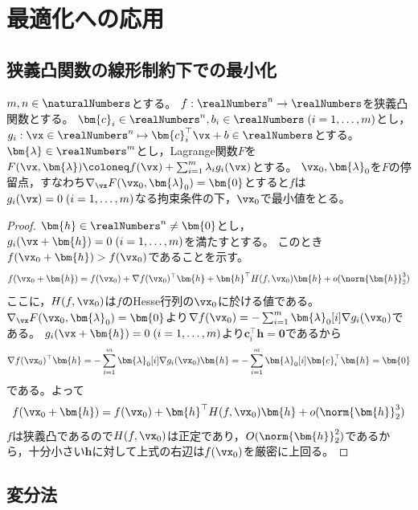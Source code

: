 \chapter{最適化への応用}
    \section{狭義凸関数の線形制約下での最小化}
        \begin{shadebox}
            $m,n\in\naturalNumbers$とする。
            $f: \realNumbers^n \to \realNumbers$を狭義凸関数とする。
            $\bm{c}_i \in \realNumbers^n, b_i \in \realNumbers\;(i=1,\dotsc,m)$とし，$g_i: \vx \in \realNumbers^n \mapsto \bm{c}_i^\top\vx + b \in \realNumbers$とする。
            $\bm{\lambda} \in \realNumbers^m$とし，Lagrange関数$F$を$F(\vx,\bm{\lambda}) \coloneq f(\vx) + \sum_{i=1}^m \lambda_i g_i(\vx)$とする。
            $\vx_0, \bm{\lambda}_0$を$F$の停留点，すなわち$\nabla_\vx F(\vx_0, \bm{\lambda}_0) = \bm{0}$とすると$f$は$g_i(\vx) = 0\;(i=1,\dotsc,m)$なる拘束条件の下，$\vx_0$で最小値をとる。
        \end{shadebox}
        \begin{proof}
            $\bm{h} \in \realNumbers^n \neq \bm{0}$とし，$g_i(\vx + \bm{h}) = 0\;(i=1,\dotsc,m)$を満たすとする。
            このとき$f(\vx_0 + \bm{h}) > f(\vx_0)$であることを示す。
            \[ f(\vx_0 + \bm{h}) = f(\vx_0) + \nabla f(\vx_0)^\top\bm{h} + \bm{h}^\top H(f,\vx_0)\bm{h} + o(\norm{\bm{h}}_2^3) \]
            ここに，$H(f,\vx_0)$は$f$のHesse行列の$\vx_0$に於ける値である。
            $\nabla_\vx F(\vx_0, \bm{\lambda}_0) = \bm{0}$より$\nabla f(\vx_0) = -\sum_{i=1}^m \bm{\lambda}_0[i] \nabla g_i(\vx_0)$である。
            $g_i(\vx + \bm{h}) = 0\;(i=1,\dotsc,m)$より$\bm{c}_i^\top\bm{h} = \bm{0}$であるから
            \[ \nabla f(\vx_0)^\top\bm{h} = -\sum_{i=1}^m \bm{\lambda}_0[i] \nabla g_i(\vx_0)\bm{h} = -\sum_{i=1}^m \bm{\lambda}_0[i] \bm{c}_i^\top\bm{h} = \bm{0} \]
            である。よって
            \[ f(\vx_0 + \bm{h}) = f(\vx_0) + \bm{h}^\top H(f,\vx_0)\bm{h} + o(\norm{\bm{h}}_2^3) \]
            $f$は狭義凸であるので$H(f,\vx_0)$は正定であり，$O(\norm{\bm{h}}_2^2)$であるから，十分小さい$\bm{h}$に対して上式の右辺は$f(\vx_0)$を厳密に上回る。
        \end{proof}
    \section{変分法}
